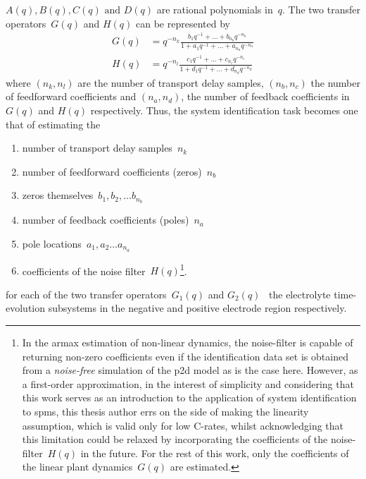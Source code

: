 \addlines[0.5]
${A(q), B(q), C(q) \text{ and } D(q)}$ are rational polynomials in~$q$. The two transfer
operators~$G(q)$ and $H(q)$ can be represented by
\begin{align}
    G(q) &= q^{-n_k}\frac{b_1q^{-1} + \dots  + b_{n_b}q^{-{n_b}}}{1 + a_1q^{-1} + \dots  + a_{n_a}q^{-{n_a}}} \label{eq:Gqoperatorrational} \\
    H(q) &= q^{-n_l}\frac{c_1q^{-1} + \dots  + c_{n_c}q^{-{n_c}}}{1 + d_1q^{-1} + \dots  + d_{n_d}q^{-{n_d}}}
\end{align}
where ${(n_k,n_l)}$ are  the number of transport  delay samples, $(n_b,n_c)$
the number  of feedforward coefficients  and ${(n_a,n_d)}$, the number  of feedback
coefficients in $G(q)$ and $H(q)$ respectively.
Thus, the system identification task becomes one that of estimating the
\begin{enumerate}[topsep=-5pt,itemsep=-1pt,partopsep=-5pt, parsep=-1pt]
    \item number of transport delay samples~$n_k$
    \item number of feedforward coefficients (zeros)~$n_b$
    \item zeros themselves~${b_1, b_2, \dots b_{n_b}}$
    \item number of feedback coefficients (poles)~$n_a$
    \item pole locations~${a_1, a_2 \dots a_{n_a}}$
    \item coefficients of the noise filter~$H(q)$\footnote{In the \gls{armax} estimation of non-linear dynamics, the
noise-filter is capable of returning non-zero coefficients even if the
identification data set is obtained from a \emph{noise-free} simulation of the
\gls{p2d} model as is the case here. However, as a first-order approximation, in
the interest of simplicity and considering that this work serves as an
introduction to the application of system identification to \glspl{spm}, this thesis author errs on
the side of making the linearity assumption, which is valid only for low
C-rates, whilst acknowledging that this
limitation could be relaxed by incorporating the coefficients of the
noise-filter~$H(q)$ in the future. For the rest of this work, only the
coefficients of the linear plant dynamics~$G(q)$ are estimated.}.
\end{enumerate}
for  each  of  the  two  transfer operators~$G_1(q)$  and  $G_2(q)$  \ie~the
electrolyte  time-evolution subsystems  in the  negative and  positive electrode
region respectively.


